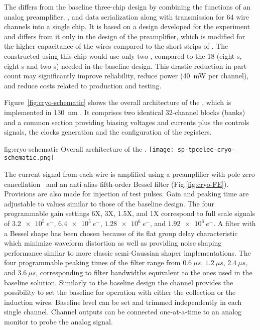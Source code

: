 \label{sec:fdsp-tpcelec-design-femb-alt-cryo}


The    differs from the baseline three-chip 
design by combining the functions of an analog preamplifier, , and 
data serialization along with transmission for \num{64} wire channels into a single 
chip. It is based on a design developed for the  experiment~\cite{nEXO} 
and differs from it only in the design of the preamplifier, which is modified for 
the higher capacitance of the   wires compared to the short
strips of . The  constructed using this chip would use only 
two , compared to the \num{18} (eight s, eight s and 
two s) needed in the baseline design. This drastic reduction in 
part count may significantly improve  reliability, reduce power 
(\SI{40}{mW} per channel), and reduce costs related to production and testing.

Figure~\ref{fig:cryo-schematic} shows the overall architecture of the 
 , which is implemented in \SI{130}{nm} . 
It comprises two identical 32-channel blocks (banks) and a common section
providing biasing voltages and currents plus the controls signals, the clocks 
generation and the configuration of the registers.

\begin{dunefigure}
{fig:cryo-schematic}
{Overall architecture of the  .}
\texttt{[image: sp-tpcelec-cryo-schematic.png]}
\end{dunefigure}

The current signal from each wire is amplified using a preamplifier with pole 
zero cancellation~\cite{DeGeronimo:2011zz} and an anti-alias fifth-order 
Bessel filter (Fig.\ref{fig:cryo-FE}). Provisions are also made for injection 
of test pulses. Gain and peaking time are adjustable to values similar to 
those of the baseline design. 
The four programmable gain settings 6X, 3X, 1.5X, and 1X correspond to full scale signals of 
$\SI{3.2e5}{e^{-}}$, $\SI{6.4e5}{e^{-}}$, $\SI{1.28e6}{e^{-}}$, and $\SI{1.92e6}{e^{-}}$. A 
filter with a Bessel shape has been chosen because of its flat group delay characteristic 
which minimize waveform distortion as well as providing noise shaping performance similar 
to more classic semi-Gaussian shaper implementations. The four programmable peaking times 
of the filter range from $\SI{0.6}{{\mu}s}$, $\SI{1.2}{{\mu}s}$, $\SI{2.4}{{\mu}s}$, 
and $\SI{3.6}{{\mu}s}$, corresponding to filter bandwidths equivalent to the ones used in 
the baseline solution. Similarly to the baseline design the channel provides the possibility 
to set the baseline for operation with either the collection or the induction wires. 
Baseline level can be set and trimmed independently in each single channel. Channel 
outputs can be connected one-at-a-time to an analog monitor to probe the analog signal.

